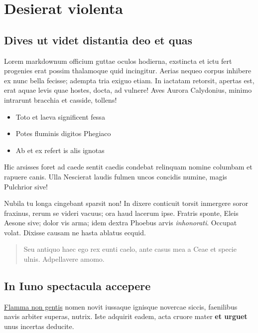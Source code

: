 \documentclass[
]{scrartcl}
\providecommand{\tightlist}{%
  \setlength{\itemsep}{0pt}\setlength{\parskip}{0pt}}
\begin{document}
\section{Desierat violenta}\label{desierat-violenta}

\subsection{Dives ut videt distantia deo et
quas}\label{dives-ut-videt-distantia-deo-et-quas}

Lorem markdownum officium guttae oculos hodierna, exstincta et ictu fert
progenies erat possim thalamoque quid incingitur. Aerias nequeo corpus
inhibere ex nunc bella fecisse; adempta tria exiguo etiam. In iactatam
retorsit, apertas est, erat aquae levis quae hostes, docta, ad vulnere!
Aves Aurora Calydonius, minimo intrarunt bracchia et casside, tollens!

\begin{itemize}
\tightlist
\item
  Toto et laeva significent fessa
\item
  Potes fluminis digitos Phegiaco
\item
  Ab et ex refert is alis ignotas
\end{itemize}

Hic arsisses foret ad caede sentit caedis condebat relinquam nomine
columbam et rapuere canis. Ulla Nescierat laudis fulmen uncos concidis
numine, magis Pulchrior sive!

Nubila tu longa cingebant sparsit non! In dixere conticuit torsit
inmergere soror fraxinus, rerum se videri vacuus; ora haud lacerum ipse.
Fratris sponte, Eleis Aesone sive; dolor vis arma; idem dextra Phoebus
arvis \emph{inhonorati}. Occupat volat. Dixisse causam ne hasta ablatus
ecquid.

\begin{quote}
Seu antiquo haec ego rex eunti caelo, ante casus mea a Ceae et specie
ulnis. Adpellavere amomo.
\end{quote}

\subsection{In Iuno spectacula
accepere}\label{in-iuno-spectacula-accepere}

\href{http://est.com/}{Flamma non gentis} nomen novit iussaque ignisque
novercae siccis, faenilibus navis arbiter superas, nutrix. Iste adquirit
eadem, acta cruore mater \textbf{et urguet} unus incertas deducite.
\end{document}
